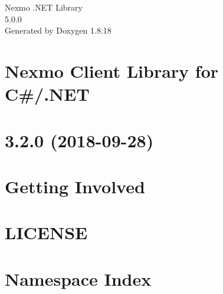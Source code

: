 \let\mypdfximage\pdfximage\def\pdfximage{\immediate\mypdfximage}\documentclass[twoside]{book}
\newcommand{\+}{\discretionary{\mbox{\scriptsize$\hookleftarrow$}}{}{}}
\newcommand{\clearemptydoublepage}{%
  \newpage{\pagestyle{empty}\cleardoublepage}%
}
\begin{document}
\hypersetup{pageanchor=false,
             bookmarksnumbered=true,
             pdfencoding=unicode
            }
\begin{titlepage}
\vspace*{7cm}
\begin{center}%
{\Large Nexmo .N\+ET Library \\[1ex]\large 5.\+0.\+0 }\\
\vspace*{1cm}
{\large Generated by Doxygen 1.8.18}\\
\end{center}
\end{titlepage}
\clearemptydoublepage
{}
\tableofcontents
\clearemptydoublepage
{}
\hypersetup{pageanchor=true}

\chapter{Nexmo Client Library for C\#/.N\+ET}
\label{index}\hypertarget{index}{}
\chapter{3.2.0 (2018-\/09-\/28)}
\label{md__c_1__users_slore__documents_projects_slorello89_nexmo-dotnet__c_h_a_n_g_e_l_o_g}

\chapter{Getting Involved}
\label{md__c_1__users_slore__documents_projects_slorello89_nexmo-dotnet__c_o_n_t_r_i_b_u_t_i_n_g}

\chapter{L\+I\+C\+E\+N\+SE}
\label{md__c_1__users_slore__documents_projects_slorello89_nexmo-dotnet__l_i_c_e_n_s_e}

\chapter{Namespace Index}

\end{document}
